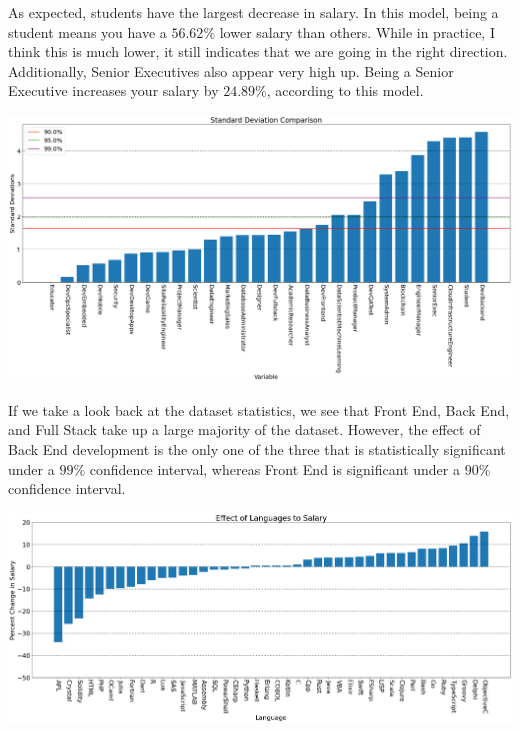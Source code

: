 \documentclass{report}
\begin{document}
\vspace{0.5in}

As expected, students have the largest decrease in salary. In this model, being a student means you have a $56.62\%$ lower salary than others. While in practice, I think this is much lower, it still indicates that we are going in the right direction. Additionally, Senior Executives also appear very high up. Being a Senior Executive increases your salary by $24.89\%$, according to this model.

\vspace{0.5in}

\includegraphics[width=0.9\linewidth]{model2confidencedevtype.png}

\vspace{0.5in}

If we take a look back at the dataset statistics, we see that Front End, Back End, and Full Stack take up a large majority of the dataset. However, the effect of Back End development is the only one of the three that is statistically significant under a $99\%$ confidence interval, whereas Front End is significant under a $90\%$ confidence interval.

\vspace{0.5in}

\includegraphics[width=0.9\linewidth]{model2coefficientlanguages.png}

\vspace{0.5in}
\end{document}
